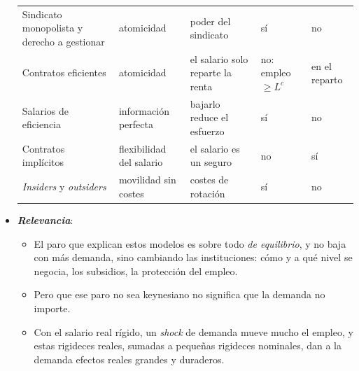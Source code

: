 \documentclass[11pt]{article}
\begin{document}
\begin{itemize}
\begin{table}[H]
\begin{tabular}{>{\raggedright\arraybackslash}m{3.3cm}>{\centering\arraybackslash}m{2.5cm}>{\centering\arraybackslash}m{3.1cm}>{\centering\arraybackslash}m{2.2cm}>{\centering\arraybackslash}m{2.3cm}}
  \midrule
  Sindicato monopolista y derecho a gestionar & atomicidad & poder del sindicato & \textcolor{tceerojo}{sí} & \textcolor{tceerojo}{no}\\
  \addlinespace[0.3em]
  Contratos eficientes & atomicidad & el salario solo reparte la renta & \textcolor{tceeverde}{no: empleo $\geq L^c$} & \textcolor{tceeverde}{en el reparto}\\
  \addlinespace[0.3em]
  Salarios de eficiencia & información perfecta & bajarlo reduce el esfuerzo & \textcolor{tceerojo}{sí} & \textcolor{tceerojo}{no}\\
  \addlinespace[0.3em]
  Contratos implícitos & flexibilidad del salario & el salario es un seguro & \textcolor{tceeverde}{no} & \textcolor{tceeverde}{sí}\\
  \addlinespace[0.3em]
  \emph{Insiders} y \emph{outsiders} & movilidad sin costes & costes de rotación & \textcolor{tceerojo}{sí} & \textcolor{tceerojo}{no}\\
  \bottomrule
  \end{tabular}
  \end{table}

\item \textbf{\emph{Relevancia}}:
  \begin{itemize}
  \item El paro que explican estos modelos es sobre todo \emph{de equilibrio}, y no baja con más demanda, sino cambiando las instituciones: cómo y a qué nivel se negocia, los subsidios, la protección del empleo.

  \item Pero que ese paro no sea keynesiano no significa que la demanda no importe.

  \item Con el salario real rígido, un \emph{shock} de demanda mueve mucho el empleo, y estas rigideces reales, sumadas a pequeñas rigideces nominales, dan a la demanda efectos reales grandes y duraderos\nocite{BallRomer1990Real}.
  \end{itemize}


\end{itemize}
\end{document}
